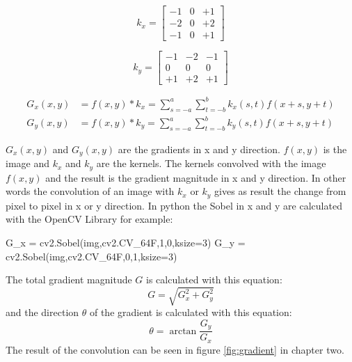 \begin{center}
    \begin{minipage}{0.44\textwidth}
        \begin{equation}
            k_x = \begin{bmatrix}
                -1 & 0 & +1 \\
                -2 & 0 & +2 \\
                -1 & 0 & +1
            \end{bmatrix} 
        \end{equation}
    \end{minipage}
    \hfill
    \begin{minipage}{0.44\textwidth}
        \begin{equation}
            k_y = \begin{bmatrix}
                -1 & -2 & -1 \\
                0 & 0 & 0 \\
                +1 & +2 & +1
            \end{bmatrix} 
        \end{equation}
         
    \end{minipage}
\end{center}

    \begin{align}
        G_x(x,y) & = f(x,y) * k_x  = \sum_{s=-a}^{a} \sum_{t=-b}^{b} k_x(s,t) f(x+s,y+t) \\
        G_y(x,y) & = f(x,y) * k_y  = \sum_{s=-a}^{a} \sum_{t=-b}^{b} k_y(s,t) f(x+s,y+t)
    \end{align}

    $G_x(x,y)$ and $G_y(x,y)$ are the gradients in x and y direction. $f(x,y)$ is the image and $k_x$ and $k_y$ are the kernels. The kernels convolved with the image $f(x,y)$ and the result is the gradient magnitude in x and y direction. In other words the convolution of an image with $k_x$ or $k_y$ gives as result the change from pixel to pixel in x or y direction.
    In python the Sobel in x and y are calculated with the OpenCV Library for example:

    \begin{python}
    G_x = cv2.Sobel(img,cv2.CV_64F,1,0,ksize=3)
    G_y = cv2.Sobel(img,cv2.CV_64F,0,1,ksize=3)
    \end{python}
    The total gradient magnitude $G$ is calculated with this equation: 
    \begin{equation}
        G = \sqrt{G_x^2 + G_y^2}
        \label{eq:gradientmagnitude}
    \end{equation} 
    and the direction $\theta$ of the gradient is calculated with this equation:
    \begin{equation}
        \theta = \arctan{\frac{G_y}{G_x}}
        \label{eq:gradientdirection}
    \end{equation}
    The result of the convolution can be seen in figure \ref{fig:gradient} in chapter two. 

